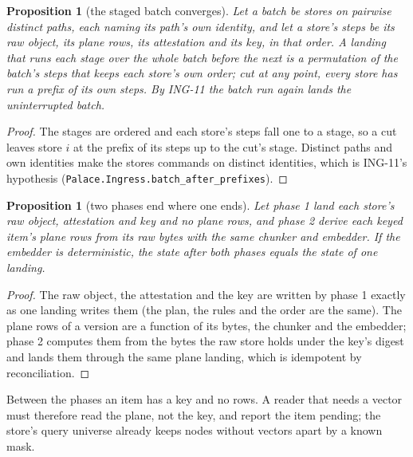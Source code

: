 \documentclass[11pt]{article}
\theoremstyle{plain}
\newtheorem{proposition}[theorem]{Proposition}
\theoremstyle{definition}
\theoremstyle{remark}
\newcommand{\lean}[1]{\texttt{#1}}
\begin{document}
\begin{proposition}[the staged batch converges]
Let a batch be stores on pairwise distinct paths, each naming its path's own identity, and let a
store's steps be its raw object, its plane rows, its attestation and its key, in that order. A
landing that runs each stage over the whole batch before the next is a permutation of the batch's
steps that keeps each store's own order; cut at any point, every store has run a prefix of its own
steps. By ING-11 the batch run again lands the uninterrupted batch.
\end{proposition}
\begin{proof}
The stages are ordered and each store's steps fall one to a stage, so a cut leaves store $i$ at the
prefix of its steps up to the cut's stage. Distinct paths and own identities make the stores commands
on distinct identities, which is ING-11's hypothesis (\lean{Palace.Ingress.batch\_after\_prefixes}).
\end{proof}

\begin{proposition}[two phases end where one ends]
Let phase 1 land each store's raw object, attestation and key and no plane rows, and phase 2 derive
each keyed item's plane rows from its raw bytes with the same chunker and embedder. If the embedder is
deterministic, the state after both phases equals the state of one landing.
\end{proposition}
\begin{proof}
The raw object, the attestation and the key are written by phase 1 exactly as one landing writes them
(the plan, the rules and the order are the same). The plane rows of a version are a function of its
bytes, the chunker and the embedder; phase 2 computes them from the bytes the raw store holds under
the key's digest and lands them through the same plane landing, which is idempotent by reconciliation.
\end{proof}
Between the phases an item has a key and no rows. A reader that needs a vector must therefore read
the plane, not the key, and report the item pending; the store's query universe already keeps nodes
without vectors apart by a known mask.
\end{document}
